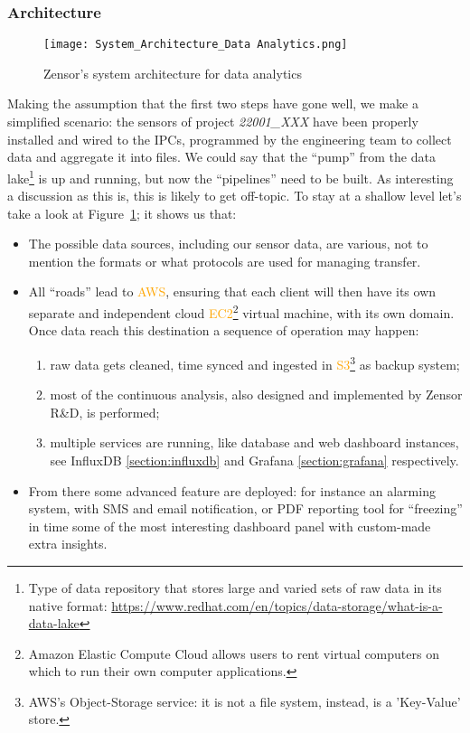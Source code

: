 \subsubsection{Architecture}
\begin{figure}[ht]
    \centering
    \texttt{[image: System\_Architecture\_Data Analytics.png]}
    \caption{Zensor's system architecture for data analytics}
    \label{fig:zensor_sys_architecture}
\end{figure}
Making the assumption that the first two steps have gone well, we make a simplified scenario: the sensors of project \textit{22001\_XXX} have been properly installed and wired to the \acs{IPCs}, programmed by the engineering team to collect data and aggregate it into files. 
We could say that the ``pump'' from the data lake\footnote{Type of data repository that stores large and varied sets of raw data in its native format: \url{https://www.redhat.com/en/topics/data-storage/what-is-a-data-lake}} is up and running, but now the ``pipelines'' 
need to be built. As interesting a discussion as this is, this is likely to get off-topic. To stay at a shallow level let's take a look at Figure~\ref{fig:zensor_sys_architecture}; it shows us that:
\begin{itemize}
	\item The possible data sources, including our sensor data, are various, not to mention the formats or what protocols are used for managing transfer. 
	\item All ``roads'' lead to \textcolor{orange}{\ac{AWS}}, ensuring that each client will then have its own separate and independent cloud \textcolor{orange}{EC2}\footnote{Amazon Elastic Compute Cloud allows users to rent virtual computers on which to run their own computer applications.} 
	virtual machine, with its own domain.
		Once data reach this destination a sequence of operation may happen:\begin{enumerate}
		\item raw data gets cleaned, time synced and ingested in \textcolor{orange}{\ac{S3}}\footnote{AWS's Object-Storage service: it is not a file system, instead, is a 'Key-Value' store.} as backup system;
		\item most of the continuous analysis, also designed and implemented by Zensor R\&D, is performed;
		\item multiple services are running, like database and web dashboard instances, see InfluxDB \ref{section:influxdb} and Grafana \ref{section:grafana} respectively.
	\end{enumerate} 
	\item From there some advanced feature are deployed: for instance an alarming system, with SMS and email notification, 
		or PDF reporting tool for ``freezing'' in time some of the most interesting dashboard panel with custom-made extra insights. %
\end{itemize}

